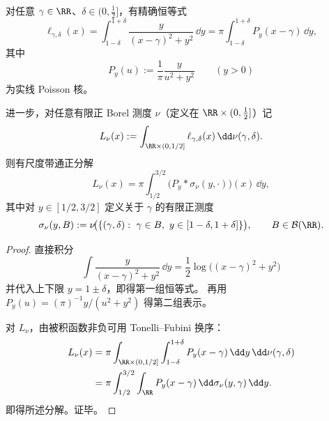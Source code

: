 \begin{theorem}\label{thm:xi-logdefect-bandpass-poisson-representation}
对任意 \(\gamma\in\RR\)、\(\delta\in(0,\tfrac12]\)，有精确恒等式
\[
\ell_{\gamma,\delta}(x)
=
\int_{1-\delta}^{1+\delta}\frac{y}{(x-\gamma)^2+y^2}\,\dd y
=
\pi\int_{1-\delta}^{1+\delta}P_y(x-\gamma)\,\dd y,
\]
其中
\[
P_y(u):=\frac{1}{\pi}\frac{y}{u^2+y^2}\qquad(y>0)
\]
为实线 Poisson 核。

进一步，对任意有限正 Borel 测度 \(\nu\)（定义在 \(\RR\times(0,\tfrac12]\)）记
\[
L_\nu(x):=\int_{\RR\times(0,1/2]} \ell_{\gamma,\delta}(x)\,\dd\nu(\gamma,\delta).
\]
则有尺度带通正分解
\[
L_\nu(x)
=
\pi\int_{1/2}^{3/2}\bigl(P_y*\sigma_\nu(y,\cdot)\bigr)(x)\,\dd y,
\]
其中对 \(y\in[1/2,3/2]\) 定义关于 \(\gamma\) 的有限正测度
\[
\sigma_\nu(y,B)
:=
\nu\!\bigl(\{(\gamma,\delta):\ \gamma\in B,\ y\in[1-\delta,1+\delta]\}\bigr),
\qquad
B\in\mathcal{B}(\RR).
\]
\end{theorem}
\begin{proof}
直接积分
\[
\int \frac{y}{(x-\gamma)^2+y^2}\,\dd y
=
\frac12\log\!\bigl((x-\gamma)^2+y^2\bigr)
\]
并代入上下限 \(y=1\pm\delta\)，即得第一组恒等式。
再用 \(P_y(u)=(\pi)^{-1}y/(u^2+y^2)\) 得第二组表示。

对 \(L_\nu\)，由被积函数非负可用 Tonelli--Fubini 换序：
\[
\begin{aligned}
L_\nu(x)
&=
\pi\int_{\RR\times(0,1/2]}\int_{1-\delta}^{1+\delta}P_y(x-\gamma)\,\dd y\,\dd\nu(\gamma,\delta)\\
&=
\pi\int_{1/2}^{3/2}\int_{\RR}P_y(x-\gamma)\,\dd\sigma_\nu(y,\gamma)\,\dd y.
\end{aligned}
\]
即得所述分解。证毕。
\end{proof}

